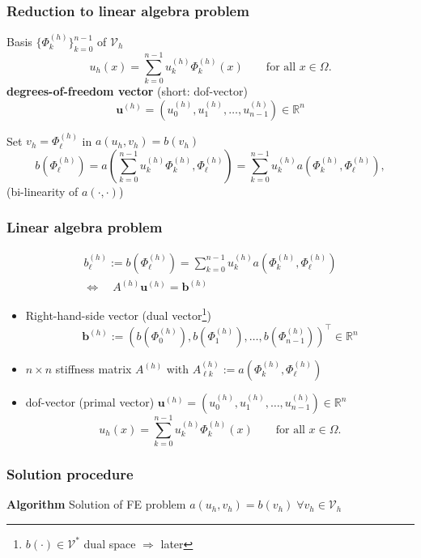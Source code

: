 \documentclass{beamer}
\begin{document}

\begin{frame}
\frametitle{Reduction to linear algebra problem}
Basis $\{\Phi^{(h)}_k\}_{k=0}^{n-1}$ of $\mathcal{V}_h$
$$
u_h(x) = \sum_{k=0}^{n-1} u^{(h)}_k \Phi^{(h)}_k(x) \qquad\text{for all $x\in\Omega$.}
$$
\textbf{degrees-of-freedom vector} (short: dof-vector)
$$
\boldsymbol{u}^{(h)}=(u^{(h)}_0,u^{(h)}_1,\dots,u^{(h)}_{n-1})\in\mathbb{R}^n
$$
 
Set $v_h=\Phi^{(h)}_\ell$ in $a(u_h,v_h) = b(v_h)$
$$
b(\Phi^{(h)}_\ell) = a\left(\sum_{k=0}^{n-1} u^{(h)}_k \Phi^{(h)}_k,\Phi^{(h)}_\ell\right) = 
\sum_{k=0}^{n-1} u^{(h)}_k a\left( \Phi^{(h)}_k,\Phi^{(h)}_\ell\right),
$$
{\footnotesize(bi-linearity of $a(\cdot,\cdot)$)}
\end{frame}


\begin{frame}
\frametitle{Linear algebra problem}
$$
\begin{aligned}
b^{(h)}_\ell:=b(\Phi^{(h)}_\ell) = \sum_{k=0}^{n-1} u^{(h)}_k a\left( \Phi^{(h)}_k,\Phi^{(h)}_\ell\right)\\
\Leftrightarrow\quad A^{(h)} \boldsymbol{u}^{(h)} = \boldsymbol{b}^{(h)}
\end{aligned}
$$
\begin{itemize}
\item Right-hand-side vector (dual vector\footnote{$b(\cdot) \in \mathcal{V}^*$ dual space $\Rightarrow$ later})
$$
\boldsymbol{b}^{(h)} := \left(b(\Phi^{(h)}_0),b(\Phi^{(h)}_1),\dots,b(\Phi^{(h)}_{n-1})\right)^\top\in\mathbb{R}^n
$$
\item $n\times n$ stiffness matrix $A^{(h)}$ with $A^{(h)}_{\ell k}:= a\left(\Phi^{(h)}_k,\Phi^{(h)}_\ell\right)$
\item dof-vector (primal vector) $\boldsymbol{u}^{(h)}=(u^{(h)}_0,u^{(h)}_1,\dots,u^{(h)}_{n-1})\in\mathbb{R}^n$
$$
u_h(x) = \sum_{k=0}^{n-1} u^{(h)}_k \Phi^{(h)}_k(x) \qquad\text{for all $x\in\Omega$.}
$$
\end{itemize}
\end{frame}


\begin{frame}
\frametitle{Solution procedure}
\textbf{Algorithm} Solution of FE problem $a(u_h,v_h)=b(v_h)\;\forall v_h\in\mathcal{V}_h$
\begin{algorithmic}[1]
\end{algorithmic}
\end{frame}
\end{document}
